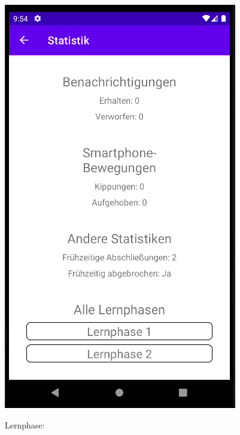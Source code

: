 \documentclass[ngerman]{tutorial}
\begin{document}
\begin{center}
    \includegraphics[scale=0.45]{stats_session_2.png}
\end{center}
\newpage
\centering Lernphase:
\end{document}
